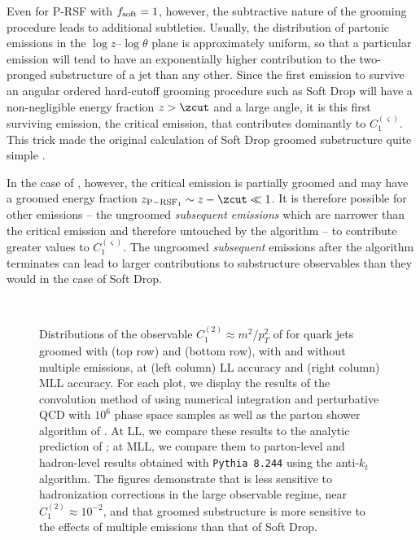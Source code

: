 \documentclass[letterpaper,11pt]{article}
\begin{document}
Even for P-RSF with \(f_{\rm soft} = 1\), however, the subtractive nature of the grooming procedure leads to additional subtleties.
%
Usually, the distribution of partonic emissions in the \(\log z\)--\(\log \theta \) plane is approximately uniform, so that a particular emission will tend to have an exponentially higher contribution to the two-pronged substructure of a jet than any other.
%
Since the first emission to survive an angular ordered hard-cutoff grooming procedure such as Soft Drop will have a non-negligible energy fraction \(z > \zcut\) and a large angle, it is this first surviving emission, the critical emission, that contributes dominantly to \(C_1^{(\varsigma)}\).
%
This trick made the original calculation of Soft Drop groomed substructure quite simple \cite{Larkoski:2014wba}.

In the case of , however, the critical emission is partially groomed and may have a groomed energy fraction \(z_{\rm P-RSF_{1}} \sim z - \zcut \ll 1\).
%
It is therefore possible for other emissions -- the ungroomed \textit{subsequent emissions} which are narrower than the critical emission and therefore untouched by the  algorithm -- to contribute greater values to \(C_1^{(\varsigma)}\).
%
The ungroomed \textit{subsequent} emissions after the  algorithm terminates can lead to larger contributions to substructure observables than they would in the case of Soft Drop.

\begin{figure}[t!]
\centering
%
\\
%
%
\caption{
Distributions of the observable \(C_1^{(2)}\approx m^2 / p_T^2\) of  for quark jets groomed with  (top row) and  (bottom row), with and without multiple emissions, at (left column) LL accuracy and (right column) MLL accuracy.
%
For each plot, we display the results of the convolution method of  using numerical integration and perturbative QCD with \(10^6\) phase space samples as well as the parton shower algorithm of .
%
At LL, we compare these results to the analytic prediction of ;
%
at MLL, we compare them to parton-level and hadron-level results obtained with \texttt{Pythia 8.244} using the anti-\(k_t\) algorithm.
%
The figures demonstrate that  is less sensitive to hadronization corrections in the large observable regime, near \(C_1^{(2)} \approx 10^{-2}\), and that  groomed substructure is more sensitive to the effects of multiple emissions than that of Soft Drop.
}
\label{fig:Calculations}
\end{figure}
\end{document}
